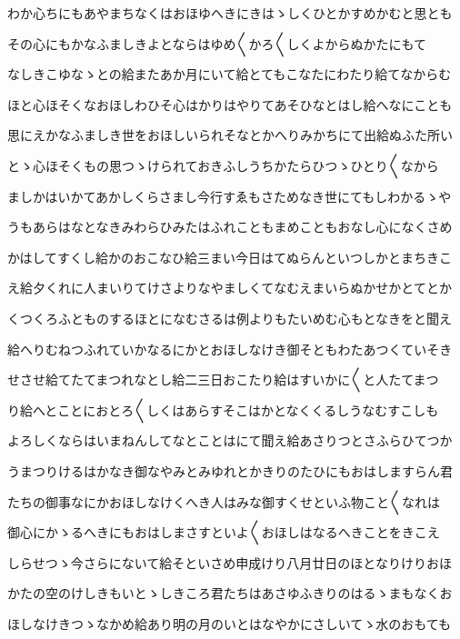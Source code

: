 \documentclass[a4paper,11pt,landscape]{ltjtarticle}
\begin{document}
\par\medskip
わか心ちにもあやまちなくはおほゆへきにきはゝしくひとかすめかむと思とも
\par\medskip
その心にもかなふましきよとならはゆめ〱かろ〱しくよからぬかたにもて
\par\medskip
なしきこゆなゝとの給またあか月にいて給とてもこなたにわたり給てなからむ
\par\medskip
ほと心ほそくなおほしわひそ心はかりはやりてあそひなとはし給へなにことも
\par\medskip
思にえかなふましき世をおほしいられそなとかへりみかちにて出給ぬふた所い
\par\medskip
とゝ心ほそくもの思つゝけられておきふしうちかたらひつゝひとり〱なから
\par\medskip
ましかはいかてあかしくらさまし今行すゑもさためなき世にてもしわかるゝや
\par\medskip
うもあらはなとなきみわらひみたはふれこともまめこともおなし心になくさめ
\par\medskip
かはしてすくし給かのおこなひ給三まい今日はてぬらんといつしかとまちきこ
\par\medskip
え給夕くれに人まいりてけさよりなやましくてなむえまいらぬかせかとてとか
\par\medskip
くつくろふとものするほとになむさるは例よりもたいめむ心もとなきをと聞え
\par\medskip
給へりむねつふれていかなるにかとおほしなけき御そともわたあつくていそき
\par\medskip
せさせ給てたてまつれなとし給二三日おこたり給はすいかに〱と人たてまつ
\par\medskip
り給へとことにおとろ〱しくはあらすそこはかとなくくるしうなむすこしも
\par\medskip
よろしくならはいまねんしてなとことはにて聞え給あさりつとさふらひてつか
\par\medskip
うまつりけるはかなき御なやみとみゆれとかきりのたひにもおはしますらん君
\par\medskip
たちの御事なにかおほしなけくへき人はみな御すくせといふ物こと〱なれは
\par\medskip
御心にかゝるへきにもおはしまさすといよ〱おほしはなるへきことをきこえ
\par\medskip
しらせつゝ今さらにないて給そといさめ申成けり八月廿日のほとなりけりおほ
\par\medskip
かたの空のけしきもいとゝしきころ君たちはあさゆふきりのはるゝまもなくお
\par\medskip
ほしなけきつゝなかめ給あり明の月のいとはなやかにさしいてゝ水のおもても
\par\medskip
\end{document}
